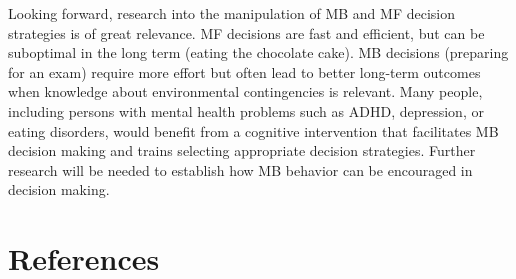 \documentclass[11pt]{article} %
\begin{document}
Looking forward, research into the manipulation of MB and MF decision strategies is of great relevance. MF decisions are fast and efficient, but can be suboptimal in the long term (eating the chocolate cake). MB decisions (preparing for an exam) require more effort but often lead to better long-term outcomes when knowledge about environmental contingencies is relevant. Many people, including persons with mental health problems such as ADHD, depression, or eating disorders, would benefit from a cognitive intervention that facilitates MB decision making and trains selecting appropriate decision strategies. Further research will be needed to establish how MB behavior can be encouraged in decision making.

\section{References}

\printbibliography
\end{document}
